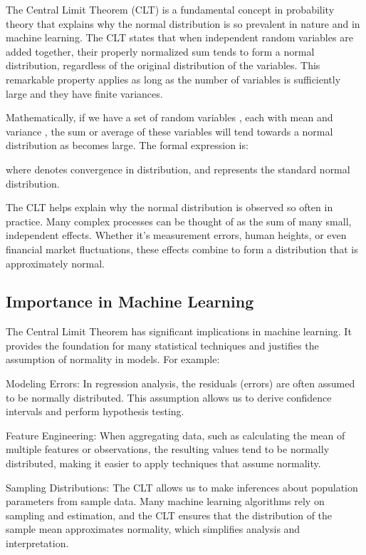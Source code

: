 \documentclass[
  12 pt,
  a4paper,
]{book}
\numberwithin{equation}{section}
\theoremstyle{plain}      %
\theoremstyle{definition} %
\theoremstyle{remark}     %
\theoremstyle{note}         %
\begin{document}
The Central Limit Theorem (CLT) is a fundamental concept in probability
theory that explains why the normal distribution is so prevalent in
nature and in machine learning. The CLT states that when independent
random variables are added together, their properly normalized sum tends
to form a normal distribution, regardless of the original distribution
of the variables. This remarkable property applies as long as the number
of variables is sufficiently large and they have finite variances.

Mathematically, if we have a set of random variables , each with mean
and variance , the sum or average of these variables will tend towards a
normal distribution as becomes large. The formal expression is:

where denotes convergence in distribution, and represents the standard
normal distribution.

The CLT helps explain why the normal distribution is observed so often
in practice. Many complex processes can be thought of as the sum of many
small, independent effects. Whether it's measurement errors, human
heights, or even financial market fluctuations, these effects combine to
form a distribution that is approximately normal.

\hypertarget{importance-in-machine-learning}{%
\subsection{Importance in Machine
Learning}\label{importance-in-machine-learning}}

The Central Limit Theorem has significant implications in machine
learning. It provides the foundation for many statistical techniques and
justifies the assumption of normality in models. For example:

Modeling Errors: In regression analysis, the residuals (errors) are
often assumed to be normally distributed. This assumption allows us to
derive confidence intervals and perform hypothesis testing.

Feature Engineering: When aggregating data, such as calculating the mean
of multiple features or observations, the resulting values tend to be
normally distributed, making it easier to apply techniques that assume
normality.

Sampling Distributions: The CLT allows us to make inferences about
population parameters from sample data. Many machine learning algorithms
rely on sampling and estimation, and the CLT ensures that the
distribution of the sample mean approximates normality, which simplifies
analysis and interpretation.
\end{document}
